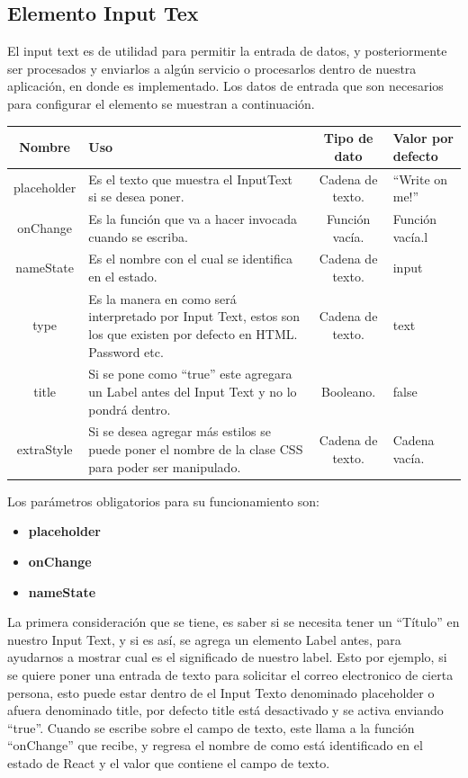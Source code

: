 \subsection{Elemento Input Tex}
El input text es de utilidad para permitir la entrada de datos, y posteriormente ser procesados y enviarlos a algún servicio o procesarlos dentro de nuestra aplicación, en donde es implementado.
Los datos de entrada que son necesarios para configurar el elemento se muestran a continuación.
\newline
\newline
\begin{center}
 \begin{tabular}{ | c |  p{5cm}  | c | p{3cm} |} 
 \hline
 \textbf{Nombre} &  \textbf{Uso} &  \textbf{ Tipo de dato} &  \textbf{Valor por defecto}\\ [0.5ex] 
 \hline\hline
placeholder &Es el texto que muestra el InputText si se desea poner.  &  Cadena de texto. 	& “Write on me!” \\  [2.5ex] 
 \hline
onChange & Es la función que va a hacer invocada cuando se escriba.     & Función vacía.  	& Función vacía.l \\[2.5ex] 
 \hline
nameState & Es el nombre con el cual se identifica en el estado.    & Cadena de texto.	& input \\[3.5ex] 
 \hline
 type   & Es la manera en como será interpretado por Input Text, estos son los que existen por defecto en HTML. Password etc.&  Cadena de texto.	& text \\[2.5ex] 
 \hline
 title  & Si se pone como “true” este agregara un Label antes del Input Text y no lo pondrá dentro.&  Booleano.	& false \\[2.5ex] 
 \hline
 extraStyle   & Si se desea agregar más estilos se puede poner el nombre de la clase CSS para poder ser manipulado.&  Cadena de texto. 	& Cadena vacía. \\[2.5ex] 
 \hline
\end{tabular}
\end{center}
\newline
\newline
Los parámetros obligatorios para su funcionamiento son:
\begin{itemize}
\item \textbf{placeholder} 
\item \textbf{onChange} 
\item \textbf{nameState} 
\end{itemize}
\newline
\newline
La primera consideración que se tiene, es saber si se necesita tener un “Título” en nuestro Input Text, y si es así, se agrega un elemento Label antes,  para ayudarnos a mostrar cual es el significado de nuestro label. Esto por ejemplo, si se quiere poner una entrada de texto para solicitar el correo electronico de cierta persona, esto puede estar dentro de el Input Texto denominado placeholder o afuera denominado title, por defecto title está desactivado y se activa enviando “true”.
Cuando se escribe sobre el campo de texto, este llama a la función “onChange” que recibe, y regresa el nombre de como está identificado en el estado de React y el valor que contiene el campo de texto.

